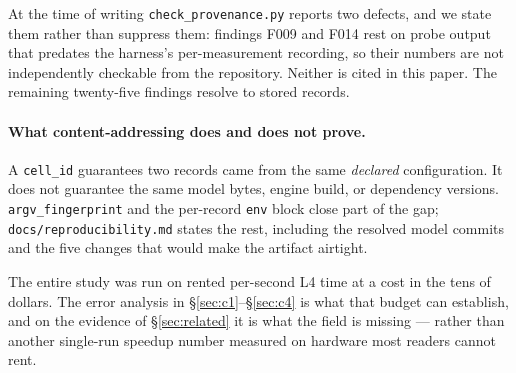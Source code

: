 \documentclass[11pt]{article}
\newcommand{\tw}[1]{\texttt{\small #1}}
\begin{document}
At the time of writing \tw{check\_provenance.py} reports two defects, and we
state them rather than suppress them: findings F009 and F014 rest on probe
output that predates the harness's per-measurement recording, so their
numbers are not independently checkable from the repository. Neither is
cited in this paper. The remaining twenty-five findings resolve to stored
records.

\paragraph{What content-addressing does and does not prove.} A
\tw{cell\_id} guarantees two records came from the same \emph{declared}
configuration. It does not guarantee the same model bytes, engine build, or
dependency versions. \tw{argv\_fingerprint} and the per-record \tw{env}
block close part of the gap; \tw{docs/reproducibility.md} states the rest,
including the resolved model commits and the five changes that would make
the artifact airtight.

The entire study was run on rented per-second L4 time at a cost in the tens
of dollars. The error analysis in \S\ref{sec:c1}--\S\ref{sec:c4} is what that
budget can establish, and on the evidence of \S\ref{sec:related} it is what
the field is missing --- rather than another single-run speedup number
measured on hardware most readers cannot rent.
\end{document}
